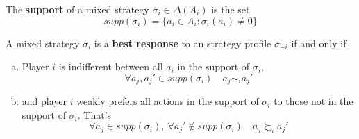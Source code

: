 \documentclass[11pt]{article}
\begin{document}
		\begin{definition}[lec.5]
			The \textbf{support} of a mixed strategy $\sigma_i \in \Delta(A_i)$ is the set
			\[
				supp(\sigma_i) = \{a_i \in A_i:\sigma_i(a_i) \neq 0\}
			\]
		\end{definition}
		
		\begin{proposition}[lec.5]
			A mixed strategy $\sigma_i$ is a \textbf{best response} to an strategy profile $\sigma_{-i}$ if and only if 
			\begin{enumerate}[(a)]
				\item Player $i$ is indifferent between all $a_i$ in the support of $\sigma_i$,
				\[
					\forall a_j, a_j' \in supp(\sigma_i)\quad a_j \sim_i a_j'
				\]
				\item \ul{and} player $i$ weakly prefers all actions in the support of $\sigma_i$ to those not in the support of $\sigma_i$. That's
				\[
					\forall a_j \in supp(\sigma_i),\ \forall a_j' \notin supp(\sigma_i)\quad a_j \succsim_i a_j'
				\]
			\end{enumerate}
		\end{proposition}
		
\end{document}
